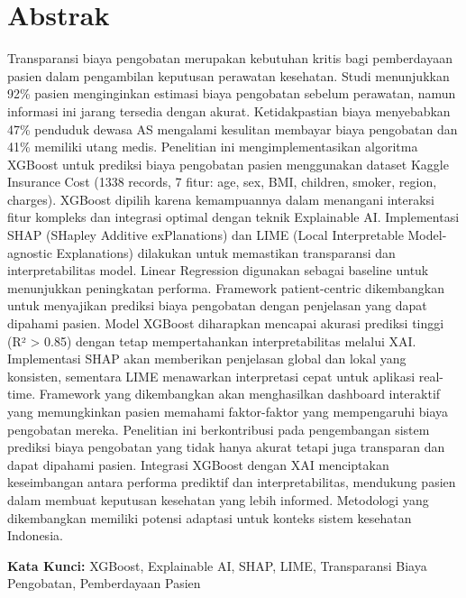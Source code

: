 \chapter*{Abstrak}
Transparansi biaya pengobatan merupakan kebutuhan kritis bagi pemberdayaan pasien dalam pengambilan keputusan perawatan kesehatan. Studi menunjukkan 92\% pasien menginginkan estimasi biaya pengobatan sebelum perawatan, namun informasi ini jarang tersedia dengan akurat. Ketidakpastian biaya menyebabkan 47\% penduduk dewasa AS mengalami kesulitan membayar biaya pengobatan dan 41\% memiliki utang medis. Penelitian ini mengimplementasikan algoritma XGBoost untuk prediksi biaya pengobatan pasien menggunakan dataset Kaggle Insurance Cost (1338 records, 7 fitur: age, sex, BMI, children, smoker, region, charges). XGBoost dipilih karena kemampuannya dalam menangani interaksi fitur kompleks dan integrasi optimal dengan teknik Explainable AI. Implementasi SHAP (SHapley Additive exPlanations) dan LIME (Local Interpretable Model-agnostic Explanations) dilakukan untuk memastikan transparansi dan interpretabilitas model. Linear Regression digunakan sebagai baseline untuk menunjukkan peningkatan performa. Framework patient-centric dikembangkan untuk menyajikan prediksi biaya pengobatan dengan penjelasan yang dapat dipahami pasien. Model XGBoost diharapkan mencapai akurasi prediksi tinggi (R² > 0.85) dengan tetap mempertahankan interpretabilitas melalui XAI. Implementasi SHAP akan memberikan penjelasan global dan lokal yang konsisten, sementara LIME menawarkan interpretasi cepat untuk aplikasi real-time. Framework yang dikembangkan akan menghasilkan dashboard interaktif yang memungkinkan pasien memahami faktor-faktor yang mempengaruhi biaya pengobatan mereka. Penelitian ini berkontribusi pada pengembangan sistem prediksi biaya pengobatan yang tidak hanya akurat tetapi juga transparan dan dapat dipahami pasien. Integrasi XGBoost dengan XAI menciptakan keseimbangan antara performa prediktif dan interpretabilitas, mendukung pasien dalam membuat keputusan kesehatan yang lebih informed. Metodologi yang dikembangkan memiliki potensi adaptasi untuk konteks sistem kesehatan Indonesia.

\vspace{0.5 cm}
\begin{flushleft}
{\textbf{Kata Kunci:} XGBoost, Explainable AI, SHAP, LIME, Transparansi Biaya Pengobatan, Pemberdayaan Pasien}
\end{flushleft}